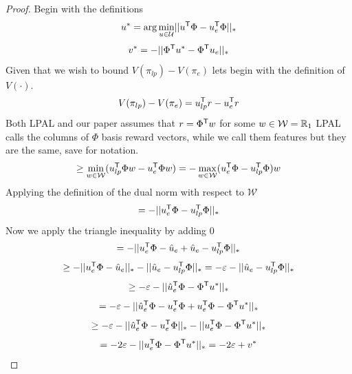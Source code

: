 \documentclass[11pt]{uai2023}
\begin{document}
\begin{proof}
	Begin with the definitions
	\[
		u^* = \arg\min_{u \in \mathcal{U}} \lvert\lvert u^{\mathsf{T}} \Phi - u_e^{\mathsf{T}} \Phi \rvert\rvert_*
	\]
	\[
		v^* = - \lvert\lvert \Phi^{\mathsf{T}} u^* - \Phi^{\mathsf{T}} u_e \rvert\rvert_*
	\]
	Given that we wish to bound $V(\pi_{lp}) - V(\pi_e)$ lets begin with the definition of $V(\cdot)$.
	\[V(\pi_{lp}) - V(\pi_e) = u_{lp}^{\mathsf{T}} r - u_e^{\mathsf{T}} r\]
	Both LPAL and our paper assumes that $r = \Phi^{\mathsf{T}} w$ for some $w \in \mathcal{W} = \mathbb{R}_{1}$ LPAL calls the columns of $\Phi$ basis
	reward vectors, while we call them features but they are the same, save for notation.
	\[\geq \min_{w \in \mathcal{W}}(u_{lp}^{\mathsf{T}} \Phi w - u_e^{\mathsf{T}} \Phi w) =- \max_{w \in \mathcal{W}}(u_e^{\mathsf{T}} \Phi - u_{lp}^{\mathsf{T}} \Phi)w \]
	Applying the definition of the dual norm with respect to $\mathcal{W}$
	\[= -\lvert\lvert u_e^{\mathsf{T}} \Phi - u_{lp}^{\mathsf{T}} \Phi \rvert\rvert_*\]
	Now we apply the triangle inequality by adding 0
	\[= -\lvert\lvert u_e^{\mathsf{T}} \Phi - \hat{u}_e + \hat{u}_e - u_{lp}^{\mathsf{T}} \Phi \rvert\rvert_*\]
	\[\geq -\lvert\lvert u_e^{\mathsf{T}} \Phi - \hat{u}_e\rvert\rvert_* - \lvert\lvert \hat{u}_e - u_{lp}^{\mathsf{T}} \Phi \rvert\rvert_* = -\varepsilon - \lvert\lvert \hat{u}_e - u_{lp}^{\mathsf{T}} \Phi \rvert\rvert_* \]
	\[\geq -\varepsilon - \lvert\lvert \hat{u}_e^{\mathsf{T}} \Phi - \Phi^{\mathsf{T}} u^*\rvert\rvert_*\]
	\[= -\varepsilon - \lvert\lvert \hat{u}_e^{\mathsf{T}} \Phi - u_e^{\mathsf{T}}\Phi + u_e^{\mathsf{T}}\Phi - \Phi^{\mathsf{T}} u^*\rvert\rvert_*\]
	\[\geq -\varepsilon - \lvert\lvert \hat{u}_e^{\mathsf{T}} \Phi - u_e^{\mathsf{T}}\Phi\rvert\rvert_* - \lvert\lvert u_e^{\mathsf{T}}\Phi - \Phi^{\mathsf{T}} u^*\rvert\rvert_*\]
	\[= -2\varepsilon - \lvert\lvert u_e^{\mathsf{T}}\Phi - \Phi^{\mathsf{T}} u^*\rvert\rvert_* = -2\varepsilon + v^*\]
\end{proof}
\end{document}
